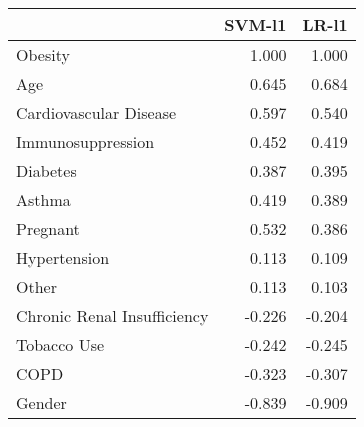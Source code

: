 \begin{tabular}{lrr}
\toprule
{} &  SVM-l1 &  LR-l1 \\
\midrule
Obesity                     &   1.000 &  1.000 \\
Age                         &   0.645 &  0.684 \\
Cardiovascular Disease      &   0.597 &  0.540 \\
Immunosuppression           &   0.452 &  0.419 \\
Diabetes                    &   0.387 &  0.395 \\
Asthma                      &   0.419 &  0.389 \\
Pregnant                    &   0.532 &  0.386 \\
Hypertension                &   0.113 &  0.109 \\
Other                       &   0.113 &  0.103 \\
Chronic Renal Insufficiency &  -0.226 & -0.204 \\
Tobacco Use                 &  -0.242 & -0.245 \\
COPD                        &  -0.323 & -0.307 \\
Gender                      &  -0.839 & -0.909 \\
\bottomrule
\end{tabular}

